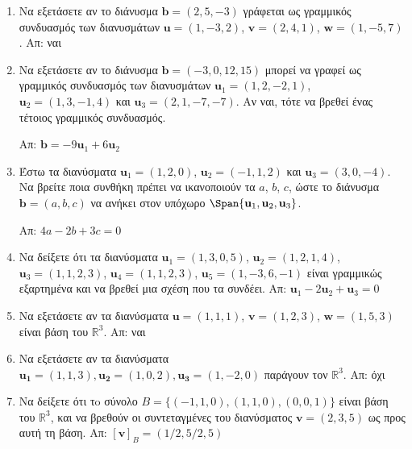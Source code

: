 \begin{enumerate}
  \item\label{ask:eksart2} Να εξετάσετε αν το διάνυσμα $ \mathbf{b} = (2,5,-3) $ 
    γράφεται ως γραμμικός συνδυασμός των διανυσμάτων $ \mathbf{u} = (1,-3,2)$, 
    $ \mathbf{v} = (2,4,1)$, $ \mathbf{w} = (1,-5,7) $.
    \hfill Απ: ναι 

  \item Να εξετάσετε αν το διάνυσμα $ \mathbf{b} = (-3,0,12,15) $ μπορεί να γραφεί 
    ως γραμμικός συνδυασμός των διανυσμάτων $ \mathbf{u}_{1} = (1,2,-2,1) $, 
    $ \mathbf{u}_{2} = (1,3,-1,4) $ και $ \mathbf{u}_{3} = (2,1,-7,-7) $. 
    Αν ναι, τότε να βρεθεί ένας τέτοιος γραμμικός συνδυασμός.

    \hfill Απ: $ \mathbf{b} = -9 \mathbf{u}_{1} + 6 \mathbf{u}_{2} $ 

  \item\label{ask:eksart3} Έστω τα διανύσματα $ \mathbf{u}_{1} = (1,2,0) $, 
    $ \mathbf{u}_{2} = (-1,1,2) $ 
    και $ \mathbf{u}_{3} = (3,0,-4) $. Να βρείτε ποια συνθήκη πρέπει να ικανοποιούν τα 
    $a$, $b$, $c$, ώστε το διάνυσμα $ \mathbf{b} = (a,b,c) $ να ανήκει στον υπόχωρο 
    $ \Span \{ \mathbf{u}_{1}, \mathbf{u}_{2}, \mathbf{u}_{3} \} $.

    \hfill Απ: $ 4a -2b + 3c = 0 $ 

  \item\label{ask:synd} Να δείξετε ότι τα διανύσματα $ \mathbf{u}_{1} = (1,3,0,5) $, 
    $ \mathbf{u}_{2} = (1,2,1,4) $, $ \mathbf{u}_{3} = (1,1,2,3)$, 
    $ \mathbf{u}_{4} = (1,1,2,3) $, $ \mathbf{u}_{5} = (1,-3,6,-1) $ 
    είναι γραμμικώς εξαρτημένα και να βρεθεί μια σχέση που τα συνδέει. 
    \hfill Απ: $ \mathbf{u}_{1} - 2 \mathbf{u}_{2} + \mathbf{u}_{3} = 0 $ 

  \item\label{ask:baseeks} Να εξετάσετε αν τα διανύσματα $ \mathbf{u} = (1,1,1)$, 
    $ \mathbf{v} = (1,2,3)$, $ \mathbf{w} = (1,5,3) $ είναι βάση του $\mathbb{R}^{3}$. 
    \hfill Απ: ναι 

  \item\label{ask:parag} Να εξετάσετε αν τα διανύσματα $ \mathbf{u_{1}} = (1,1,3), 
    \mathbf{u_{2}} = (1,0,2), \mathbf{u_{3}}= (1,-2,0)$ παράγουν τον $ \mathbb{R}^{3} $.
    \hfill Απ: όχι 

  \item Να δείξετε ότι τo σύνολο $ B = \{ (-1,1,0), (1,1,0), 
    (0,0,1) \} $ είναι βάση του 
    $ \mathbb{R}^{3} $, και να βρεθούν οι συντεταγμένες του διανύσματος 
    $ \mathbf{v} = (2,3,5) $ ως προς αυτή τη βάση.
    \hfill Απ: $ [\mathbf{v}]_{B} = (1/2,5/2,5) $ 


\end{enumerate}
